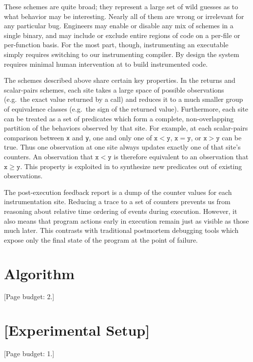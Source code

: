 \documentclass{sig-alternate}
\newcommand{\placeholder}[1]{{\color[cmyk]{0,0.61,0.87,0}[#1]}}
\begin{document}
These schemes are quite broad; they represent a large set of wild
guesses as to what behavior may be interesting.  Nearly all of them
are wrong or irrelevant for any particular bug.  Engineers may enable
or disable any mix of schemes in a single binary, and may include or
exclude entire regions of code on a per-file or per-function basis.
For the most part, though, instrumenting an executable simply requires
switching to our instrumenting compiler.  By design the system
requires minimal human intervention at to build instrumented code.

The schemes described above share certain key properties.  In the
returns and scalar-pairs schemes, each site takes a large space of
possible observations (e.g.\ the exact value returned by a call) and
reduces it to a much smaller group of equivalence classes (e.g.\ the
sign of the returned value).  Furthermore, each site can be treated as
a set of predicates which form a complete, non-overlapping partition
of the behaviors observed by that site.  For example, at each
scalar-pairs comparison between \texttt{x} and \texttt{y}, one and
only one of $\mathtt{x} < \mathtt{y}$, $\mathtt{x} = \mathtt{y}$, or
$\mathtt{x} > \mathtt{y}$ can be true.  Thus one observation at one
site always updates exactly one of that site's counters.  An
observation that $\mathtt{x} < \mathtt{y}$ is therefore equivalent to
an observation that $\mathtt{x} \geq \mathtt{y}$.  This property is
exploited in  to synthesize new predicates out
of existing observations.

The post-execution feedback report is a dump of the counter values for
each instrumentation site.  Reducing a trace to a set of counters
prevents us from reasoning about relative time ordering of events
during execution.  However, it also means that program actions early
in execution remain just as visible as those much later.  This
contrasts with traditional postmortem debugging tools which expose
only the final state of the program at the point of failure.

\section{Algorithm}
\label{sec:algorithm}

\placeholder{Page budget: 2.}



\section{\placeholder{Experimental Setup}}
\label{sec:experiments:setup}
\placeholder{Page budget: 1.}
\end{document}
